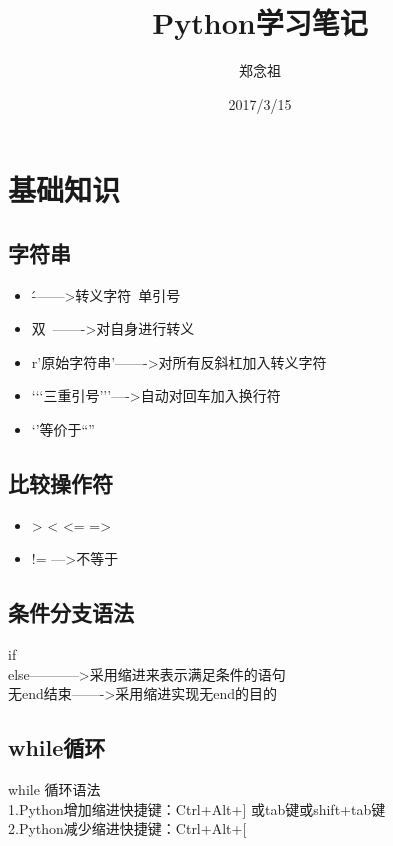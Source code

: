 \documentclass[a4paper,10pt]{ctexart}
\begin{document}
\title{Python学习笔记}
\author{郑念祖}
\date{2017/3/15}
\maketitle

\section{基础知识}

\subsection{字符串 }
\begin{itemize}
  \item  \' ------->转义字符\ 单引号
  \item 双\ ------->对自身进行转义
  \item r'原始字符串'------->对所有反斜杠加入转义字符
  \item ‘‘‘三重引号’’’---->自动对回车加入换行符
  \item ‘’等价于“”
\end{itemize}


\subsection{比较操作符}
\begin{itemize}
  \item >  <  <=  =>  \\
  \item != --->不等于\\
\end{itemize}



\subsection{条件分支语法}
\noindent if\\
else----------->采用缩进来表示满足条件的语句 \\
无end结束------->采用缩进实现无end的目的


\subsection{while循环}
\noindent while 循环语法\\
1.Python增加缩进快捷键：Ctrl+Alt+] 或tab键或shift+tab键\\
2.Python减少缩进快捷键：Ctrl+Alt+[ \\
\end{document}
